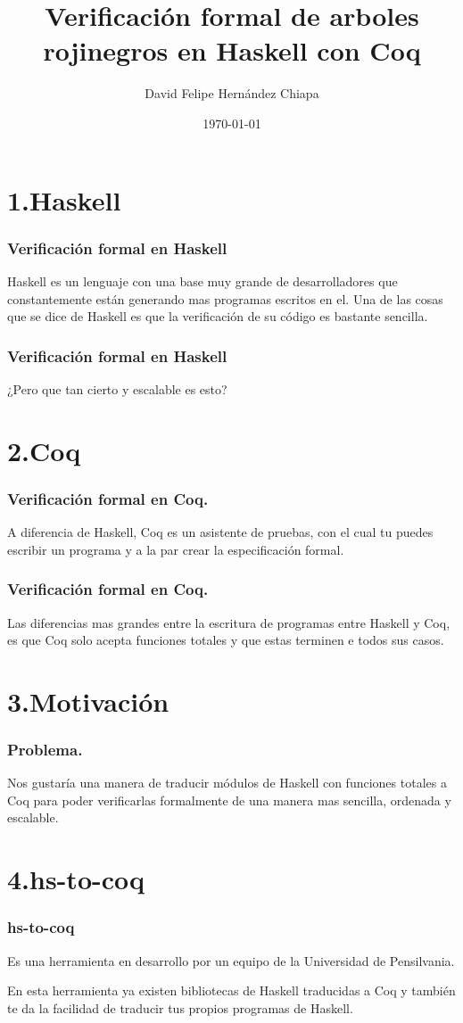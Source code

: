 \documentclass[xcolor=dvipsnames,table,handout]{beamer}
\title[]{Verificación formal de arboles rojinegros en Haskell con Coq}
\author[]{David Felipe Hernández Chiapa}
\institute[UNAM-FC]{Facultad de Ciencias\\
Universidad Nacional Aut\'onoma de M\'exico}
\date[]{\small{\today}}
\begin{document}
\frame{\titlepage}

\section{1.Haskell}
\begin{frame}
  \frametitle{Verificación formal en Haskell}
    Haskell es un lenguaje con una base muy grande de desarrolladores que constantemente están generando mas programas escritos en el.
    \newline Una de las cosas que se dice de Haskell es que la verificación de su código es bastante sencilla.

\end{frame}

\begin{frame}
  \frametitle{Verificación formal en Haskell}
    \centering¿Pero que tan cierto y escalable es esto?
\end{frame}
\section{2.Coq}
\begin{frame}
  \frametitle{Verificación formal en Coq.}
	A diferencia de Haskell, Coq es un asistente de pruebas, con el cual tu puedes escribir un programa y a la par crear la especificación formal.
\end{frame}

\begin{frame}
  \frametitle{Verificación formal en Coq.}
    Las diferencias mas grandes entre la escritura de programas entre Haskell y Coq, es que Coq solo acepta funciones totales y que estas terminen e todos sus casos. 
\end{frame}
\section{3.Motivación}
\begin{frame}
  \frametitle{Problema.}
       Nos gustaría una manera de traducir módulos de Haskell con funciones totales a Coq para poder verificarlas formalmente de una manera mas sencilla, ordenada y escalable.
\end{frame}
\section{4.hs-to-coq}
\begin{frame}
  \frametitle{hs-to-coq}
       Es una herramienta en desarrollo por un equipo de la Universidad de Pensilvania.
       
       En esta herramienta ya existen bibliotecas de Haskell traducidas a Coq y también te da la facilidad de traducir tus propios programas de Haskell.
\end{frame}
\end{document}
